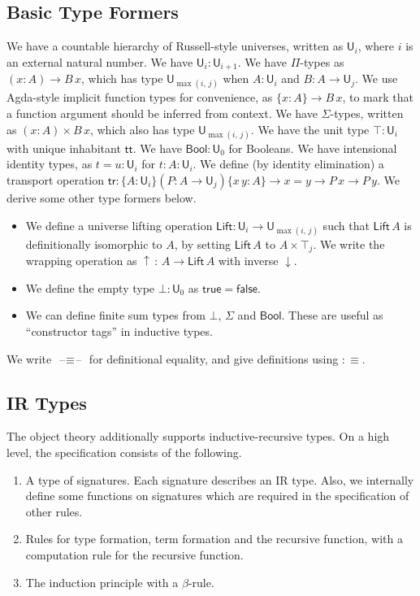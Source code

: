 \documentclass[acmsmall,screen,review,anonymous]{acmart}
\newcommand{\msf}[1]{{\mathsf{#1}}}
\newcommand{\U}{\msf{U}}
\newcommand{\Lift}{\msf{Lift}}
\newcommand{\lup}{\uparrow}
\newcommand{\ldown}{\downarrow}
\newcommand{\ttt}{\msf{tt}}
\newcommand{\blank}{{\mathord{\hspace{1pt}\text{--}\hspace{1pt}}}}
\newcommand{\tr}{\msf{tr}}
\newcommand{\Bool}{\msf{Bool}}
\newcommand{\true}{\msf{true}}
\newcommand{\false}{\msf{false}}
\begin{document}
\subsection{Basic Type Formers}
We have a countable hierarchy of Russell-style universes, written as $\U_i$, where $i$ is an
external natural number. We have $\U_i : \U_{i + 1}$. We have $\Pi$-types as $(x : A) \to B\,x$,
which has type $\U_{\max(i,\,j)}$ when $A : \U_i$ and $B : A \to \U_j$. We use Agda-style implicit
function types for convenience, as $\{x : A\} \to B\,x$, to mark that a function argument should be
inferred from context. We have $\Sigma$-types, written as $(x : A) \times B\,x$, which also has type
$\U_{\max(i,\,j)}$. We have the unit type $\top : \U_i$ with unique inhabitant $\ttt$. We have
$\Bool : \U_0$ for Booleans. We have intensional identity types, as $t = u : \U_i$ for $t : A :
\U_i$. We define (by identity elimination) a transport operation $\tr : \{A : \U_i\}(P : A \to
\U_j)\{x\,y : A\} \to x = y \to P\,x \to P\,y$. We derive some other type formers below.
\begin{itemize}
  \item We define a universe lifting operation $\Lift : \U_i \to \U_{\max(i,\,j)}$ such that
    $\Lift\,A$ is definitionally isomorphic to $A$, by setting $\Lift\,A$ to $A \times \top_j$. We
    write the wrapping operation as $\lup\,:\,A \to \Lift\,A$ with inverse $\ldown$.
  \item We define the empty type $\bot : \U_0$ as $\true = \false$.
  \item We can define finite sum types from $\bot$, $\Sigma$ and $\Bool$. These are useful
    as ``constructor tags'' in inductive types.
\end{itemize}
We write $\blank\!\!\equiv\!\!\blank$ for definitional equality, and give definitions using $:\equiv$.

\subsection{IR Types}
The object theory additionally supports inductive-recursive types. On a high level, the specification consists
of the following.
\begin{enumerate}
\item A type of signatures. Each signature describes an IR type. Also, we internally define some
  functions on signatures which are required in the specification of other rules.
\item Rules for type formation, term formation and the recursive function, with a computation rule
  for the recursive function.
\item The induction principle with a $\beta$-rule.
\end{enumerate}
\end{document}
